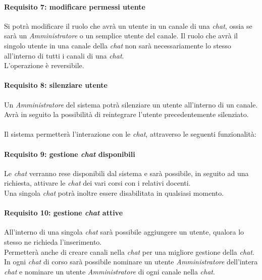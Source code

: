 \paragraph{Requisito 7: modificare permessi utente\\}
Si potrà modificare il ruolo che avrà un utente in un canale di una \emph{chat}, ossia se sarà un \emph{Amministratore} o un semplice utente del canale. Il ruolo che avrà il singolo utente in una canale della \emph{chat} non sarà necessariamente lo stesso all’interno di tutti i canali di una \emph{chat}.\\ 
L’operazione è reversibile.

\paragraph{Requisito 8: silenziare utente\\}
Un \emph{Amministratore} del sistema potrà silenziare un utente all’interno di un canale. Avrà in seguito la possibilità di reintegrare l’utente precedentemente silenziato.\\
\\
Il sistema permetterà l’interazione con le \emph{chat}, attraverso le seguenti funzionalità:

\paragraph{Requisito 9: gestione \emph{chat} disponibili\\}
Le \emph{chat} verranno rese disponibili dal sistema e sarà possibile, in seguito ad una richiesta, attivare le \emph{chat} dei vari corsi con i relativi docenti.\\ 
Una singola \emph{chat} potrà inoltre essere disabilitata in qualsiasi momento.

\paragraph{Requisito 10: gestione \emph{chat} attive\\}
All’interno di una singola \emph{chat} sarà possibile aggiungere un utente, qualora lo stesso ne richieda l’inserimento.\\
Permetterà anche di creare canali nella \emph{chat} per una migliore gestione della \emph{chat}. 
In ogni \emph{chat} di corso sarà possibile nominare un utente \emph{Amministratore} dell’intera \emph{chat} e nominare un utente \emph{Amministratore} di ogni canale nella \emph{chat}.

